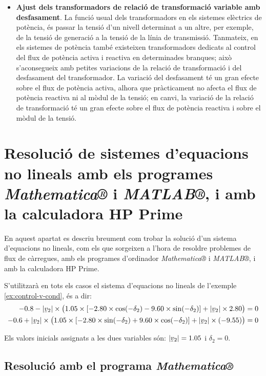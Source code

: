 \begin{itemize}
   \item \textbf{Ajust  dels transformadors de relació de transformació variable amb   desfasament}. La funció usual dels transformadors en els sistemes elèctrics de potència,
    és passar la tensió d'un nivell determinat a un altre, per exemple, de la tensió de generació
    a la tensió de la línia de transmissió. Tanmateix, en els sistemes de potència també existeixen
    transformadors dedicats al control del flux de potència activa i reactiva en determinades
    branques; això s'aconsegueix amb petites variacions de la relació de transformació i del
    desfasament del transformador. La variació del desfasament té un gran efecte sobre el flux
    de potència activa, alhora que pràcticament no afecta el flux de potència reactiva ni al
    mòdul de la tensió; en canvi, la variació de la relació de transformació té un gran efecte
    sobre el flux de potència reactiva i sobre el mòdul de la tensió.
\end{itemize}

\section{Resolució de sistemes d'equacions no lineals amb els programes \emph{Mathematica®} i
\emph{MATLAB®},  i amb la calculadora \textsf{HP Prime}}
\label{sec:sis_eq_no_lin}


En aquest apartat es descriu breument com trobar la solució d'un sistema d'equacions no lineals, com els que sorgeixen a l'hora de resoldre problemes de flux de càrregues, amb els programes d'ordinador \emph{Mathematica®} i \emph{MATLAB®}, i amb la calculadora \textsf{HP Prime}.

S'utilitzarà en tots els casos el sistema d'equacions no lineals de l'exemple \vref{ex:control-v-cond}, és a dir:
\begin{align*}
\num{-0,8} - |\cmplx{v}_2| \times \bigl( \num{1,05}\times [\num{-2,80}\times \cos(-\delta_2) - \num{9,60} \times
\sin( -\delta_2)]  + |\cmplx{v}_2| \times \num{2,80} \bigr) &= 0 \\
-\num{0,6} + |\cmplx{v}_2| \times\bigl( \num{1,05} \times[\num{-2,80}\times\sin(-\delta_2) +
\num{9,60}\times\cos( -\delta_2)]  + |\cmplx{v}_2|\times (\num{-9,55}) \bigr) &= 0
\end{align*}

Els valors inicials assignats a les dues variables són: $|\cmplx{v}_2|=\num{1,05}$ i $\delta_2=0$.

\subsection{Resolució amb el programa \emph{Mathematica®}}

